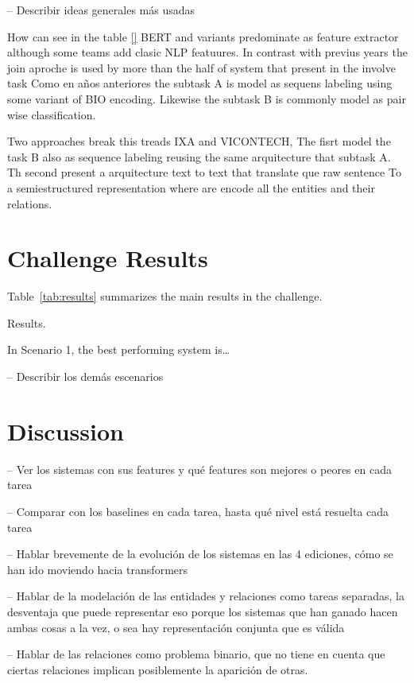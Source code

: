 \documentclass[a4paper,11pt,twocolumn,twoside]{article}
\begin{document}
-- Describir ideas generales más usadas

How can see in the table \ref{} BERT and variants predominate as feature extractor although
some teams add clasic NLP featuures.
In contrast with previus years the join aproche is used by more than the half of system that present in the involve task
Como en años anteriores the subtask A is model as sequens labeling using some variant of BIO encoding. 
Likewise the subtask B is commonly model as pair wise classification.

Two approaches break this treads IXA and VICONTECH, The fisrt model the task B
also as sequence labeling reusing the same arquitecture that subtask A.
Th second present a arquitecture text to text that translate que raw sentence To
a semiestructured representation where are encode all the entities and their relations.

\section{Challenge Results}\label{sec:results}

Table~\ref{tab:results} summarizes the main results in the challenge.

\begin{table}
  \caption{Results.\label{tab:results}}
\end{table}

In Scenario 1, the best performing system is\dots

-- Describir los demás escenarios

\section{Discussion}\label{sec:discussion}

-- Ver los sistemas con sus features y qué features son mejores o peores en cada tarea

-- Comparar con los baselines en cada tarea, hasta qué nivel está resuelta cada tarea

-- Hablar brevemente de la evolución de los sistemas en las 4 ediciones,
cómo se han ido moviendo hacia transformers

-- Hablar de la modelación de las entidades y relaciones como tareas separadas,
la desventaja que puede representar eso porque los sistemas que han ganado hacen
ambas cosas a la vez, o sea hay representación conjunta que es válida

-- Hablar de las relaciones como problema binario, que no tiene en cuenta que ciertas
relaciones implican posiblemente la aparición de otras.
\end{document}
